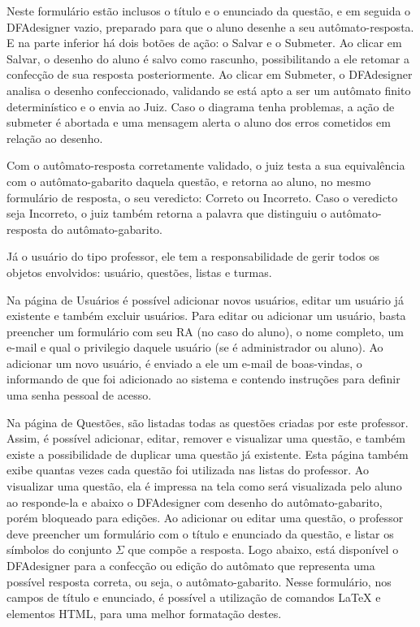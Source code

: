 \documentclass[
	12pt,				%
	openany,
	oneside,
	a4paper,			%
	english,			%
	brazil				%
	]{abntex2}
\begin{document}
  Neste formulário estão inclusos o título e o enunciado da questão, e em seguida o DFAdesigner vazio, preparado para que o aluno desenhe a seu autômato-resposta. E na parte inferior há dois botões de ação: o Salvar e o Submeter. Ao clicar em Salvar, o desenho do aluno é salvo como rascunho, possibilitando a ele retomar a confecção de sua resposta posteriormente. Ao clicar em Submeter, o DFAdesigner analisa o desenho confeccionado, validando se está apto a ser um autômato finito determinístico e o envia ao Juiz. Caso o diagrama tenha problemas, a ação de submeter é abortada e uma mensagem alerta o aluno dos erros cometidos em relação ao desenho.

  Com o autômato-resposta corretamente validado, o juiz testa a sua equivalência com o autômato-gabarito daquela questão, e retorna ao aluno, no mesmo formulário de resposta, o seu veredicto: Correto ou Incorreto. Caso o veredicto seja Incorreto, o juiz também retorna a palavra que distinguiu o autômato-resposta do autômato-gabarito.

  Já o usuário do tipo professor, ele tem a responsabilidade de gerir todos os objetos envolvidos: usuário, questões, listas e turmas.

  Na página de Usuários é possível adicionar novos usuários, editar um usuário já existente e também excluir usuários. Para editar ou adicionar um usuário, basta preencher um formulário com seu RA (no caso do aluno), o nome completo, um e-mail e qual o privilegio daquele usuário (se é administrador ou aluno). Ao adicionar um novo usuário, é enviado a ele um e-mail de boas-vindas, o informando de que foi adicionado ao sistema e contendo instruções para definir uma senha pessoal de acesso.

  Na página de Questões, são listadas todas as questões criadas por este professor. Assim, é possível adicionar, editar, remover e visualizar uma questão, e também existe a possibilidade de duplicar uma questão já existente. Esta página também exibe quantas vezes cada questão foi utilizada nas listas do professor. Ao visualizar uma questão, ela é impressa na tela como será visualizada pelo aluno ao responde-la e abaixo o DFAdesigner com desenho do autômato-gabarito, porém bloqueado para edições. Ao adicionar ou editar uma questão, o professor deve preencher um formulário com o título e enunciado da questão, e listar os símbolos do conjunto $\Sigma$ que compõe a resposta. Logo abaixo, está disponível o DFAdesigner para a confecção ou edição do autômato que representa uma possível resposta correta, ou seja, o autômato-gabarito. Nesse formulário, nos campos de título e enunciado, é possível a utilização de comandos \LaTeX\xspace e elementos HTML, para uma melhor formatação destes.
\end{document}
